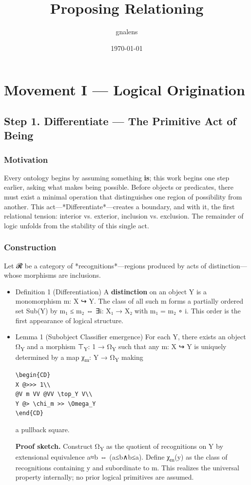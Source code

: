 \documentclass[11pt]{article}
\author{gnalens}
\date{\today}
\title{Proposing Relationing}
\begin{document}
\maketitle
\section*{Movement I — Logical Origination}
\label{sec:orgff67d0a}
\subsection*{Step 1. Differentiate — The Primitive Act of Being}
\label{sec:orgbe6c7b1}

\subsubsection*{Motivation}
\label{sec:org57c1a37}
Every ontology begins by assuming something \textbf{is}; this work begins one step earlier, asking what makes being possible.  
Before objects or predicates, there must exist a minimal operation that distinguishes one region of possibility from another.  
This act—*Differentiate*—creates a boundary, and with it, the first relational tension: interior vs. exterior, inclusion vs. exclusion.  
The remainder of logic unfolds from the stability of this single act.
\subsubsection*{Construction}
\label{sec:orgf76f240}
Let 𝓡 be a category of *recognitions*—regions produced by acts of distinction—whose morphisms are inclusions.
\begin{itemize}
\item Definition 1 (Differentiation)
\label{sec:org764a860}
A \textbf{distinction} on an object Y is a monomorphism m: X ↪ Y.  
The class of all such m forms a partially ordered set Sub(Y) by  
m₁ ≤ m₂ ⇔ ∃i: X₁ → X₂ with m₁ = m₂ ∘ i.  
This order is the first appearance of logical structure.
\item Lemma 1 (Subobject Classifier emergence)
\label{sec:org410d80e}
For each Y, there exists an object Ω\textsubscript{Y} and a morphism ⊤\textsubscript{Y}: 1 → Ω\textsubscript{Y} such that any m: X ↪ Y is uniquely determined by a map χ\textsubscript{m}: Y → Ω\textsubscript{Y} making

\begin{verbatim}
\begin{CD}
X @>>> 1\\
@V m VV @VV \top_Y V\\
Y @> \chi_m >> \Omega_Y
\end{CD}
\end{verbatim}

a pullback square.

\textbf{Proof sketch.}  
Construct Ω\textsubscript{Y} as the quotient of recognitions on Y by extensional equivalence a≈b ⇔ (a≤b∧b≤a).  
Define χ\textsubscript{m}(y) as the class of recognitions containing y and subordinate to m.  
This realizes the universal property internally; no prior logical primitives are assumed.
\end{itemize}
\end{document}
